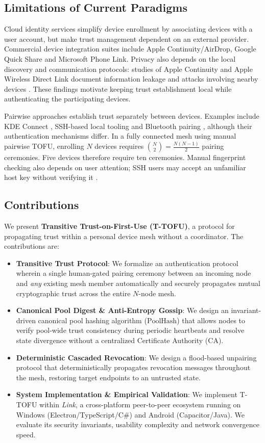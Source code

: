 \documentclass[conference,a4paper]{IEEEtran}
\begin{document}
\subsection{Limitations of Current Paradigms}
Cloud identity services simplify device enrollment by associating devices with a user account, but make trust management dependent on an external provider. Commercial device integration suites include Apple Continuity/AirDrop, Google Quick Share and Microsoft Phone Link. Privacy also depends on the local discovery and communication protocols: studies of Apple Continuity and Apple Wireless Direct Link document information leakage and attacks involving nearby devices \cite{celosia2020discontinued, stute2019billion}. These findings motivate keeping trust establishment local while authenticating the participating devices.

Pairwise approaches establish trust separately between devices. Examples include KDE Connect \cite{kdeconnect}, SSH-based local tooling and Bluetooth pairing \cite{antonioli2023bluffs}, although their authentication mechanisms differ. In a fully connected mesh using manual pairwise TOFU, enrolling $N$ devices requires $\binom{N}{2} = \frac{N(N-1)}{2}$ pairing ceremonies. Five devices therefore require ten ceremonies. Manual fingerprint checking also depends on user attention; SSH users may accept an unfamiliar host key without verifying it \cite{neef2022ssh}.

\subsection{Contributions}
We present \textbf{Transitive Trust-on-First-Use (T-TOFU)}, a protocol for propagating trust within a personal device mesh without a coordinator. The contributions are:
\begin{itemize}
    \item \textbf{Transitive Trust Protocol}: We formalize an authentication protocol wherein a single human-gated pairing ceremony between an incoming node and \textit{any} existing mesh member automatically and securely propagates mutual cryptographic trust across the entire $N$-node mesh.
    \item \textbf{Canonical Pool Digest \& Anti-Entropy Gossip}: We design an invariant-driven canonical pool hashing algorithm ($\text{PoolHash}$) that allows nodes to verify pool-wide trust consistency during periodic heartbeats and resolve state divergence without a centralized Certificate Authority (CA).
    \item \textbf{Deterministic Cascaded Revocation}: We design a flood-based unpairing protocol that deterministically propagates revocation messages throughout the mesh, restoring target endpoints to an untrusted state.
    \item \textbf{System Implementation \& Empirical Validation}: We implement T-TOFU within \textit{Link}, a cross-platform peer-to-peer ecosystem running on Windows (Electron/TypeScript/C\#) and Android (Capacitor/Java). We evaluate its security invariants, usability complexity and network convergence speed.
\end{itemize}
\end{document}
